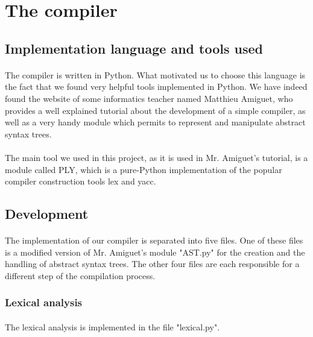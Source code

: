 \documentclass[12pt,a4paper]{article}
\begin{document}
\section{The compiler}

\subsection{Implementation language and tools used}

\paragraph{}
The compiler is written in Python. What motivated us to choose this language is the fact that we found very helpful tools implemented in Python. We have indeed found the website of some informatics teacher named Matthieu Amiguet, who provides a well explained tutorial about the development of a simple compiler, as well as a very handy module which permits to represent and manipulate abstract syntax trees.  

\paragraph{}
The main tool we used in this project, as it is used in Mr. Amiguet's tutorial, is a module called PLY, which is a pure-Python implementation of the popular compiler construction tools lex and yacc.  

\subsection{Development}

\paragraph{}
The implementation of our compiler is separated into five files. One of these files is a modified version of Mr. Amiguet's module "AST.py" for the creation and the handling of abstract syntax trees. The other four files are each responsible for a different step of the compilation process. 

\subsubsection{Lexical analysis}

\paragraph{}
The lexical analysis is implemented in the file "lexical.py".
\end{document}
